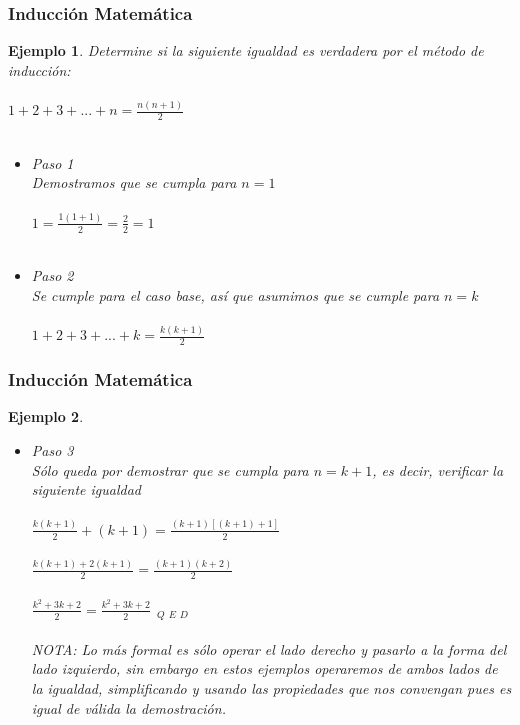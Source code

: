 \documentclass[11pt]{beamer}
\newtheorem{ejem}{Ejemplo}
\begin{document}
\begin{frame}
\frametitle{Inducción Matemática}
\begin{ejem}
Determine si la siguiente igualdad es verdadera por el método de inducción:\\ \hspace{0cm} \\
$1 + 2 + 3 + ... + n = \frac{n(n + 1)}{2}$\\ \hspace{0cm} \\
\begin{itemize}
\item Paso 1\\
Demostramos que se cumpla para $n = 1$\\ \hspace{0cm} \\
$1 = \frac{1(1 + 1)}{2} = \frac{2}{2} = 1$\\ \hspace{0cm} \\
\item Paso 2\\
Se cumple para el caso base, así que asumimos que se cumple para $n = k$\\ \hspace{0cm} \\
$1 + 2 + 3 + ... + k = \frac{k(k + 1)}{2}$
\end{itemize}
\end{ejem}
\end{frame}

\begin{frame}
\frametitle{Inducción Matemática}
\begin{ejem}
\begin{itemize}
\item Paso 3\\
Sólo queda por demostrar que se cumpla para $n = k+1$, es decir, verificar la siguiente igualdad\\ \hspace{0cm} \\
$\frac{k(k + 1)}{2} + (k+1) = \frac{(k+1)[(k+1)+1]}{2}$\\ \hspace{0cm} \\
$\frac{k(k + 1)+2(k+1)}{2} = \frac{(k+1)(k+2)}{2}$\\ \hspace{0cm} \\
$\frac{k^2+3k+2}{2} = \frac{k^2+3k+2}{2} ~ ~ _Q ~ _E ~ _D$\\ \hspace{0cm} \\
NOTA: Lo más formal es sólo operar el lado derecho y pasarlo a la forma del lado izquierdo, sin embargo en estos ejemplos operaremos de ambos lados de la igualdad, simplificando y usando las propiedades que nos convengan pues es igual de válida la demostración.
\end{itemize}
\end{ejem}
\end{frame}
\end{document}
